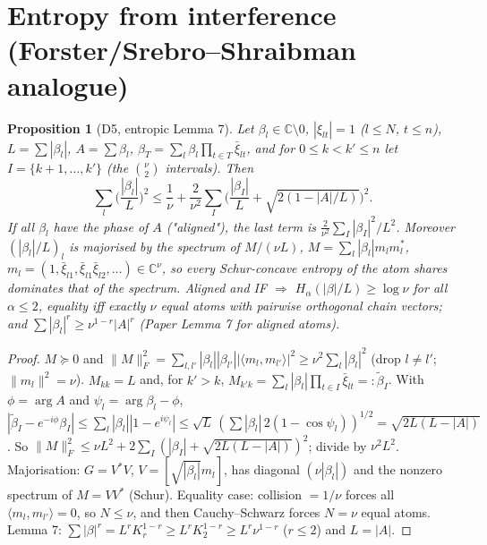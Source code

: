 \documentclass[11pt]{article}
\newtheorem{proposition}{Proposition}[section]\newtheorem{lemma}[proposition]{Lemma}\newtheorem{corollary}[proposition]{Corollary}
\theoremstyle{remark}\newtheorem{remark}[proposition]{Remark}
\begin{document}
\section{Entropy from interference (Forster/Srebro--Shraibman analogue)}
\begin{proposition}[D5, entropic Lemma 7]\label{p:l7}
Let $\beta_l\in\mathbb C\setminus0$, $|\xi_{lt}|=1$ ($l\le N$, $t\le n$), $L=\sum|\beta_l|$, $A=\sum\beta_l$, $\beta_T=\sum_l\beta_l\prod_{t\in T}\bar\xi_{lt}$, and for $0\le k<k'\le n$ let
$I=\{k+1,\dots,k'\}$ (the $\binom\nu2$ intervals). Then
\[\sum_l\Big(\frac{|\beta_l|}L\Big)^2\le\frac1\nu+\frac2{\nu^2}\sum_I\Big(\frac{|\beta_I|}L+\sqrt{2(1-|A|/L)}\Big)^2 .\]
If all $\beta_l$ have the phase of $A$ ("aligned"), the last term is $\frac2{\nu^2}\sum_I|\beta_I|^2/L^2$. Moreover $(|\beta_l|/L)_l$ is majorised by the spectrum of
$M/(\nu L)$, $M=\sum_l|\beta_l|m_lm_l^*$, $m_l=(1,\bar\xi_{l1},\bar\xi_{l1}\bar\xi_{l2},\dots)\in\mathbb C^\nu$, so every Schur-concave entropy of the atom shares
dominates that of the spectrum. Aligned and IF $\Rightarrow$ $H_\alpha(|\beta|/L)\ge\log\nu$ for all $\alpha\le2$, equality iff exactly $\nu$ equal atoms with pairwise
orthogonal chain vectors; and $\sum|\beta_l|^r\ge\nu^{1-r}|A|^r$ (Paper Lemma 7 for aligned atoms).
\end{proposition}
\begin{proof}
$M\succeq0$ and $\|M\|_F^2=\sum_{l,l'}|\beta_l||\beta_{l'}||\langle m_l,m_{l'}\rangle|^2\ge\nu^2\sum_l|\beta_l|^2$ (drop $l\ne l'$; $\|m_l\|^2=\nu$).
$M_{kk}=L$ and, for $k'>k$, $M_{k'k}=\sum_l|\beta_l|\prod_{t\in I}\bar\xi_{lt}=:\tilde\beta_I$. With $\phi=\arg A$ and $\psi_l=\arg\beta_l-\phi$,
$|\tilde\beta_I-e^{-i\phi}\beta_I|\le\sum_l|\beta_l||1-e^{i\psi_l}|\le\sqrt L\,(\sum|\beta_l|\,2(1-\cos\psi_l))^{1/2}=\sqrt{2L(L-|A|)}$. So
$\|M\|_F^2\le\nu L^2+2\sum_I(|\beta_I|+\sqrt{2L(L-|A|)})^2$; divide by $\nu^2L^2$. Majorisation: $G=V^*V$, $V=[\sqrt{|\beta_l|}m_l]$, has diagonal
$(\nu|\beta_l|)$ and the nonzero spectrum of $M=VV^*$ (Schur). Equality case: collision $=1/\nu$ forces all $\langle m_l,m_{l'}\rangle=0$, so $N\le\nu$, and then
Cauchy--Schwarz forces $N=\nu$ equal atoms. Lemma 7: $\sum|\beta|^r=L^rK_r^{1-r}\ge L^rK_2^{1-r}\ge L^r\nu^{1-r}$ ($r\le2$) and $L=|A|$.
\end{proof}
\end{document}
